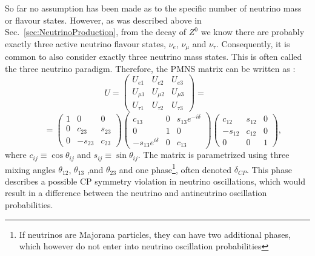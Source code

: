 So far no assumption has been made as to the specific number of neutrino mass or flavour states. However, as was described above in Sec.~\ref{sec:NeutrinoProduction}, from the decay of $Z^0$ we know there are probably exactly three active neutrino flavour states, $\nu_e$, $\nu_\mu$ and $\nu_\tau$. Consequently, it is common to also consider exactly three neutrino mass states. This is often called the three neutrino paradigm. Therefore, the \gls{PMNS} matrix can be written as \cite{FundamentalsOfNeutrinoPhysics.pdf}:
\[
U=
\begin{pmatrix}
 U_{e1}     & U_{e2}     & U_{e3}    \\
 U_{\mu 1}  & U_{\mu 2}  & U_{\mu 3} \\
 U_{\tau 1} & U_{\tau 2} & U_{\tau 3}
\end{pmatrix}
=\,\,\,
\]
\begin{equation}\label{param3}
\,\,\,\,\,\,\,\, =
\begin{pmatrix}
 1 & 0       & 0      \\
 0 & c_{23}  & s_{23} \\
 0 & -s_{23} & c_{23}
\end{pmatrix}
\begin{pmatrix}
 c_{13}              & 0 & s_{13}e^{-i\delta} \\
 0                   & 1 & 0                  \\
 -s_{13}e^{i\delta} & 0 & c_{13}
\end{pmatrix}
\begin{pmatrix}
 c_{12}  & s_{12} & 0 \\
 -s_{12} & c_{12} & 0 \\
 0       & 0      & 1
\end{pmatrix},
\end{equation}
where $c_{ij}\equiv\cos\theta_{ij}$ and $s_{ij}\equiv\sin\theta_{ij}$. The matrix is parametrized using three mixing angles $\theta_{12}$, $\theta_{13}$ ,and $\theta_{23}$ and one phase\footnote{If neutrinos are Majorana particles, they can have two additional phases, which however do not enter into neutrino oscillation probabilities}, often denoted $\delta_{CP}$. This phase describes a possible \gls{CP} symmetry violation in neutrino oscillations, which would result in a difference between the neutrino and antineutrino oscillation probabilities.

